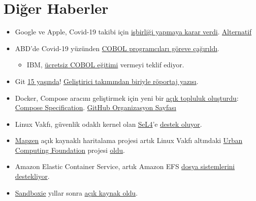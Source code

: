 \documentclass[11pt]{article}
\begin{document}
\section{Diğer Haberler}
\label{sec:orge6cb317}
\begin{itemize}
\item Google ve Apple, Covid-19 takibi için \href{https://www.apple.com/newsroom/2020/04/apple-and-google-partner-on-covid-19-contact-tracing-technology/}{işbirliği yapmaya karar verdi}.
\href{https://www.bbc.com/news/technology-52246319}{Alternatif}
\item ABD'de Covid-19 yüzünden \href{https://nymag.com/intelligencer/2020/04/what-is-cobol-what-does-it-have-to-do-with-the-coronavirus.html}{COBOL programcıları göreve çağırıldı}.
\begin{itemize}
\item IBM, \href{https://www.inputmag.com/tech/ibm-will-offer-free-cobol-training-to-address-overloaded-unemployment-systems}{ücretsiz COBOL eğitimi} vermeyi teklif ediyor.
\end{itemize}
\item Git \href{https://opensource.com/article/20/4/get-started-git}{15 yaşında}! \href{https://github.blog/2020-04-07-celebrating-15-years-of-git-an-interview-with-git-maintainer-junio-hamano/}{Geliştirici takımından biriyle röportaj yazısı}.
\item Docker, Compose aracını geliştirmek için yeni bir \href{https://www.docker.com/blog/announcing-the-compose-specification/}{açık topluluk oluşturdu}:
\href{https://compose-spec.io/}{Compose Specification}. \href{https://github.com/compose-spec}{GitHub Organizasyon Sayfası}
\item Linux Vakfı, güvenlik odaklı kernel olan \href{https://sel4.systems/About/}{SeL4}'e \href{https://www.zdnet.com/article/linux-foundation-backs-security-oriented-sel4-microkernel-operating-system/}{destek oluyor}.
\item \href{https://www.mapzen.com/}{Mapzen} açık kaynaklı haritalama projesi artık Linux Vakfı altındaki \href{https://uc.foundation/}{Urban
Computing Foundation} projesi \href{https://www.zdnet.com/article/mapzen-open-source-mapping-project-revived-under-the-urban-computing-foundation/}{oldu}.
\item Amazon Elastic Container Service, artık Amazon EFS \href{https://aws.amazon.com/tr/blogs/aws/amazon-ecs-supports-efs/}{dosya sistemlerini
destekliyor}.
\item \href{https://www.sandboxie.com/}{Sandboxie} yıllar sonra \href{https://news.sophos.com/en-us/2020/04/09/sandboxie-is-now-an-open-source-tool/}{açık kaynak oldu}.

\end{itemize}
\end{document}
